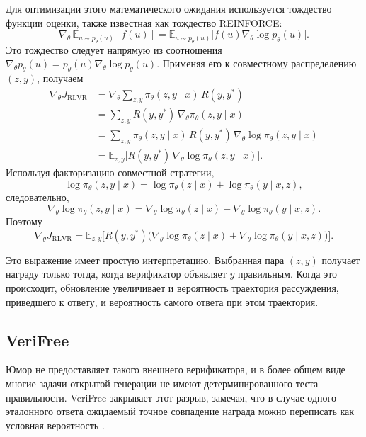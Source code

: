 Для оптимизации этого математического ожидания используется тождество функции оценки, также известная как тождество REINFORCE:
\[
 \nabla_{\theta}\,\mathbb{E}_{u\sim p_{\theta}(u)}[f(u)]
 =
 \mathbb{E}_{u\sim p_{\theta}(u)}
 \big[f(u)\nabla_{\theta}\log p_{\theta}(u)\big].
\]
Это тождество следует напрямую из соотношения \(\nabla_{\theta}p_{\theta}(u)=p_{\theta}(u)\nabla_{\theta}\log p_{\theta}(u)\). Применяя его к совместному распределению \((z,y)\), получаем
\begin{align*}
 \nabla_{\theta}J_{\mathrm{RLVR}}
 & =
 \nabla_{\theta}
 \sum_{z,y}\pi_{\theta}(z,y\mid x)\,R(y,y^{*}) \\
 & =
 \sum_{z,y}R(y,y^{*})\,\nabla_{\theta}\pi_{\theta}(z,y\mid x) \\
 & =
 \sum_{z,y}\pi_{\theta}(z,y\mid x)\,R(y,y^{*})\,\nabla_{\theta}\log\pi_{\theta}(z,y\mid x) \\
 & =
 \mathbb{E}_{z,y}\Big[
 R(y,y^{*})\,\nabla_{\theta}\log\pi_{\theta}(z,y\mid x)
 \Big].
\end{align*}
Используя факторизацию совместной стратегии,
\[
 \log\pi_{\theta}(z,y\mid x)
 =
 \log\pi_{\theta}(z\mid x)+\log\pi_{\theta}(y\mid x,z),
\]
следовательно,
\[
 \nabla_{\theta}\log\pi_{\theta}(z,y\mid x)
 =
 \nabla_{\theta}\log\pi_{\theta}(z\mid x)
 +
 \nabla_{\theta}\log\pi_{\theta}(y\mid x,z).
\]
Поэтому
\[
 \nabla_{\theta}J_{\mathrm{RLVR}}
 =
 \mathbb{E}_{z,y}\Big[
 R(y,y^{*})
 \big(
 \nabla_{\theta}\log\pi_{\theta}(z\mid x)
 +
 \nabla_{\theta}\log\pi_{\theta}(y\mid x,z)
 \big)
 \Big].
\]

Это выражение имеет простую интерпретацию. Выбранная пара \((z,y)\) получает награду только тогда, когда верификатор объявляет \(y\) правильным. Когда это происходит, обновление увеличивает и вероятность траектория рассуждения, приведшего к ответу, и вероятность самого ответа при этом траектория.

\subsection{VeriFree}

Юмор не предоставляет такого внешнего верификатора, и в более общем виде многие задачи открытой генерации не имеют детерминированного теста правильности. VeriFree закрывает этот разрыв, замечая, что в случае одного эталонного ответа ожидаемый точное совпадение награда можно переписать как условная вероятность \citep{Zhou2025}.


